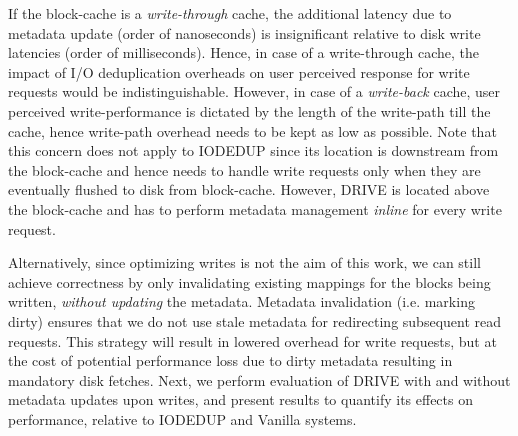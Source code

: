 If the block-cache is a \textit{write-through} cache, the additional latency
due to metadata update (order of nanoseconds) is insignificant
relative to disk write latencies (order of milliseconds). Hence, in
case of a write-through cache, the impact of I/O deduplication overheads
on user perceived response for write requests would
be indistinguishable. However, in case of a \textit{write-back} cache,
user perceived write-performance is dictated by the length of the
write-path till the cache, hence write-path overhead needs to be kept
as low as possible. Note that this concern does not apply to IODEDUP since
its location is downstream from the block-cache and hence needs to
handle write requests only when they are eventually flushed to disk
from block-cache. However, DRIVE is located above the
block-cache and has to perform metadata management \textit{inline} for
every write request.

Alternatively, since optimizing writes is not the aim of this work, we
can still achieve correctness by only invalidating existing mappings
for the blocks being written, \textit{without updating} the metadata.
Metadata invalidation (i.e. marking dirty) ensures that we
do not use stale metadata for redirecting subsequent read requests.
This strategy will result in lowered overhead for write requests,
but at the cost of potential performance loss due to dirty metadata 
resulting in mandatory disk fetches.
Next, we perform evaluation of DRIVE with and without metadata updates 
upon writes,
and present results to quantify its effects on performance, relative to
IODEDUP and Vanilla systems.

